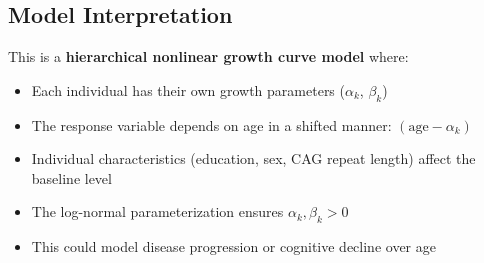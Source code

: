 \documentclass[12pt]{article}
\begin{document}
\subsection{Model Interpretation}

This is a \textbf{hierarchical nonlinear growth curve model} where:
\begin{itemize}
    \item Each individual has their own growth parameters ($\alpha_k$, $\beta_k$)
    \item The response variable depends on age in a shifted manner: $(\text{age} - \alpha_k)$
    \item Individual characteristics (education, sex, CAG repeat length) affect the baseline level
    \item The log-normal parameterization ensures $\alpha_k, \beta_k > 0$
    \item This could model disease progression or cognitive decline over age
\end{itemize}
\end{document}
